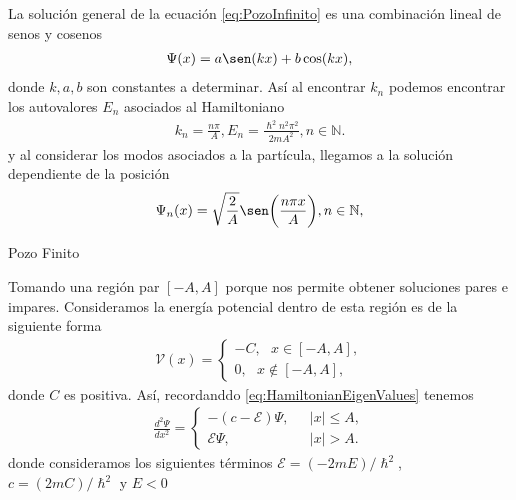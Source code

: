 \documentclass[aspectratio=1610]{beamer}
\newcommand*{\field}[1]{\mathbb{#1}}
\begin{document}
\begin{frame}{}
 La solución general de la ecuación \eqref{eq:PozoInfinito} es una combinación lineal de senos y cosenos
\begin{align*}
    \Psi(x) = a\sen(kx) + b\cos(kx),
\end{align*}   
donde $k,a,b$ son constantes a determinar. Así al encontrar $k_{n}$ podemos encontrar los autovalores $E_{n}$ asociados al Hamiltoniano
\begin{align*}
    k_{n}=\frac{n\pi}{A}, E_{n} = \frac{\hslash^2n^2\pi^2}{2mA^2}, n \in \field{N}.
\end{align*}
y al considerar los modos asociados a la partícula, llegamos a la solución dependiente de la posición
\begin{align}
    \Psi_{n}(x) = \sqrt{\frac{2}{A}}\sen\bigg(\frac{n\pi x}{A}\bigg), n \in \field{N},
    \label{eq:PsiPI}
\end{align}
    
\end{frame}


\begin{frame}{Pozo Finito}
   
Tomando una región par $[-A , A]$ porque nos permite obtener soluciones pares e impares. Consideramos la energía potencial dentro de esta región es de la siguiente forma  
\begin{align}
        \mathcal{V}(x) = 
        \left\{ \begin{array}{ll}
        -C, \:\:\:  x \in [-A,A],
        \\
        0, \:\:\: x \notin [-A,A],
        \end{array}
        \right.
        \label{eq:PotencialFinito}
\end{align}
donde $C$ es positiva. Así, recordanddo \eqref{eq:HamiltonianEigenValues} tenemos
\begin{align}
        \frac{d^2\Psi}{dx^2}= 
        \left\{ \begin{array}{ll}
        -(c-\mathcal{E})\Psi,& \:\:\:  |x| \leq A,
        \\
        \mathcal{E}\Psi,& \:\:\: |x| > A.
        \end{array}
        \right.
        \label{eq:SCsimple}
\end{align}
donde consideramos los siguientes términos $\mathcal{E} = (-2mE)/\hslash^2$, \\ $c = (2mC)/\hslash^2$ y $ E<0$
    
\begin{columns}
\column{37em}
\end{columns}
\end{frame}
\end{document}
